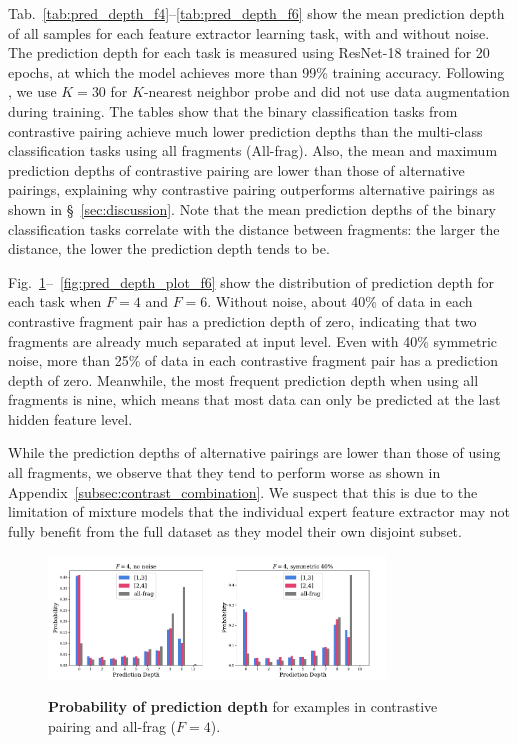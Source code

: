 \documentclass{article}
\theoremstyle{plain}
\theoremstyle{definition}
\theoremstyle{remark}
\begin{document}
Tab.~\ref{tab:pred_depth_f4}--\ref{tab:pred_depth_f6} show the mean prediction depth of all samples for each feature extractor learning task, with and without noise.
The prediction depth for each task is measured using ResNet-18 trained for 20 epochs, at which the model achieves more than 99\% training accuracy.
Following \citet{baldock21nips}, we use $K=30$ for $K$-nearest neighbor probe and did not use data augmentation during training.
The tables show that the binary classification tasks from contrastive pairing achieve much lower prediction depths than the multi-class classification tasks using all fragments (All-frag).
Also, the mean and maximum prediction depths of contrastive pairing are lower than those of alternative pairings, explaining why contrastive pairing outperforms alternative pairings as shown in \S~\ref{sec:discussion}.
Note that the mean prediction depths of the binary classification tasks correlate with the distance between fragments: the larger the distance, the lower the prediction depth tends to be.

Fig.~\ref{fig:pred_depth_plot_f4}--~\ref{fig:pred_depth_plot_f6} show the distribution of prediction depth for each task when $F=4$ and $F=6$.
Without noise, about 40\% of data in each contrastive fragment pair has a prediction depth of zero, indicating that two fragments are already much separated at input level.
Even with 40\% symmetric noise, more than 25\% of data in each contrastive fragment pair has a prediction depth of zero.
Meanwhile, the most frequent prediction depth when using all fragments is nine, which means that most data can only be predicted at the last hidden feature level.

While the prediction depths of alternative pairings are lower than those of using all fragments, we observe that they tend to perform worse as shown in Appendix~\ref{subsec:contrast_combination}.
We suspect that this is due to the limitation of mixture models that the individual expert feature extractor may not fully benefit from the full dataset as they model their own disjoint subset.


\begin{figure}[th]
\begin{center}
\centerline{\includegraphics[width=0.8\textwidth]{imgs/pred_depth_plot_f4.pdf}}
\caption{
    \textbf{Probability of prediction depth} for examples in contrastive pairing and all-frag ($F=4$).}
\vskip -0.15in
\label{fig:pred_depth_plot_f4}
\end{center}
\end{figure}
\end{document}
